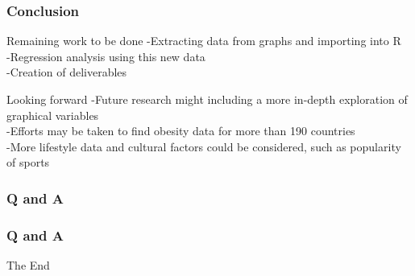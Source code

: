 \documentclass{beamer}
\begin{document}
\begin{frame}
\frametitle{Conclusion}
\begin{block}
{Remaining work to be done}
-Extracting data from graphs and importing into R
\\
-Regression analysis using this new data
\\
-Creation of deliverables
\end{block}

\begin{block}
{Looking forward}
-Future research might including a more in-depth exploration of graphical variables
\\
-Efforts may be taken to find obesity data for more than 190 countries
\\
-More lifestyle data and cultural factors could be considered, such as popularity of sports
\end{block}
\end{frame}
 

\begin{frame}[fragile]
    \frametitle{Q and A}
\begin{itemize}
\end{itemize}
\end{frame}

\begin{frame}[fragile]
    \frametitle{Q and A}
\begin{itemize}
\end{itemize}
\end{frame}

\begin{frame}
\centerline{The End}
\end{frame}
\end{document}
